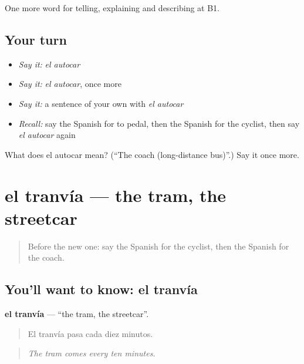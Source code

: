 \begin{grammarlens}[title={What you've built}]
One more word for telling, explaining and describing at B1.
\end{grammarlens}

\subsection*{Your turn}
\begin{itemize}
\raggedright
  \item \emph{Say it:} \emph{el autocar}
  \item \emph{Say it:} \emph{el autocar}, once more
  \item \emph{Say it:} a sentence of your own with \emph{el autocar}
  \item \emph{Recall:} say the Spanish for to pedal, then the Spanish for the cyclist, then say \emph{el autocar} again
\end{itemize}

\begin{tcolorbox}[breakable,colback=teal!4,colframe=teal!35!black,title={Before you move on}]
What does el autocar mean? (\textquotedblleft{}The coach (long-distance bus)\textquotedblright{}.) Say it once more.
\end{tcolorbox}
\section[el tranvía]{el tranvía — the tram, the streetcar}

\label{lesson:ES-C650-tranvia}



\begin{quote}
Before the new one: say the Spanish for the cyclist, then the Spanish for the coach.
\end{quote}

\subsection*{You'll want to know: el tranvía}
\textbf{el tranvía} — \textquotedblleft{}the tram, the streetcar\textquotedblright{}.

\begin{quote}
El tranvía pasa cada diez minutos.
\end{quote}

\begin{quote}
\emph{The tram comes every ten minutes.}
\end{quote}


